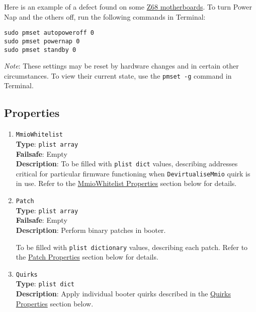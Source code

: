 \documentclass[]{article}
\makeatletter
\renewcommand{\label}[1]{%
\zref@wrapper@immediate{\oldlabel{#1}}}  %
\makeatother
\begin{document}
Here is an example of a defect found on some
\href{http://www.insanelymac.com/forum/topic/329624-need-cmos-reset-after-sleep-only-after-login/#entry2534645}{Z68 motherboards}.
To turn Power Nap and the others off, run the following commands in Terminal:
\begin{lstlisting}[label=powernap, style=ocbash]
sudo pmset autopoweroff 0
sudo pmset powernap 0
sudo pmset standby 0
\end{lstlisting}

\emph{Note}: These settings may be reset by hardware changes and in certain other circumstances.
To view their current state, use the \texttt{pmset -g} command in Terminal.

\subsection{Properties}\label{booterprops}

\begin{enumerate}

\item
  \texttt{MmioWhitelist}\\
  \textbf{Type}: \texttt{plist\ array}\\
  \textbf{Failsafe}: Empty\\
  \textbf{Description}: To be filled with \texttt{plist\ dict} values,
  describing addresses critical for particular firmware functioning when
  \texttt{DevirtualiseMmio} quirk is in use.
  Refer to the \hyperref[booterpropsmmio]{MmioWhitelist Properties} section below for details.

\item
  \texttt{Patch}\\
  \textbf{Type}: \texttt{plist\ array}\\
  \textbf{Failsafe}: Empty\\
  \textbf{Description}: Perform binary patches in booter.

  To be filled with \texttt{plist\ dictionary} values, describing each
  patch. Refer to the \hyperref[booterpropspatch]{Patch Properties} section below for details.

\item
  \texttt{Quirks}\\
  \textbf{Type}: \texttt{plist\ dict}\\
  \textbf{Description}: Apply individual booter quirks described
  in the \hyperref[booterpropsquirks]{Quirks Properties} section below.

\end{enumerate}
\end{document}
